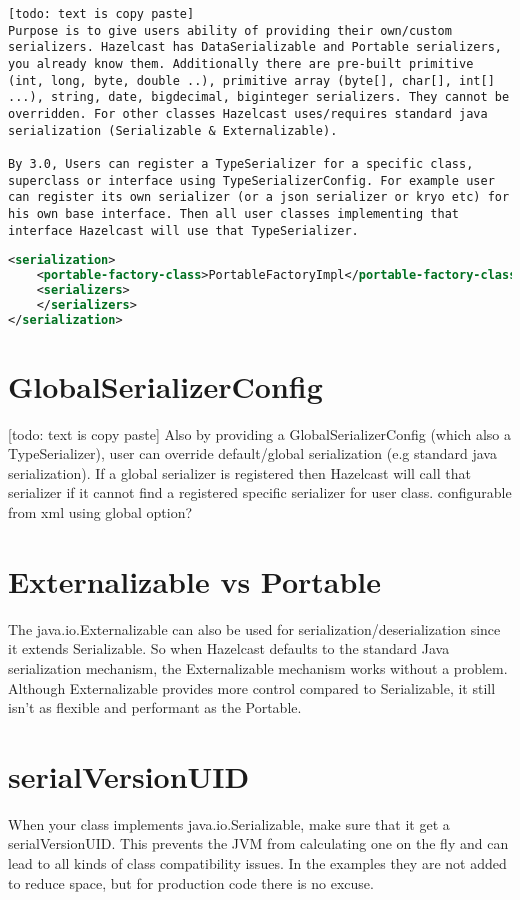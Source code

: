\begin{lstlisting}
[todo: text is copy paste]
Purpose is to give users ability of providing their own/custom serializers. Hazelcast has DataSerializable and Portable serializers, you already know them. Additionally there are pre-built primitive (int, long, byte, double ..), primitive array (byte[], char[], int[] ...), string, date, bigdecimal, biginteger serializers. They cannot be overridden. For other classes Hazelcast uses/requires standard java serialization (Serializable & Externalizable). 

By 3.0, Users can register a TypeSerializer for a specific class, superclass or interface using TypeSerializerConfig. For example user can register its own serializer (or a json serializer or kryo etc) for his own base interface. Then all user classes implementing that interface Hazelcast will use that TypeSerializer.
\end{lstlisting}

\begin{lstlisting}[language=xml]
<serialization>
    <portable-factory-class>PortableFactoryImpl</portable-factory-class>
    <serializers>
    </serializers>
</serialization>
\end{lstlisting}

\section{GlobalSerializerConfig}
[todo: text is copy paste]
Also by providing a GlobalSerializerConfig (which also a TypeSerializer), user can override default/global serialization (e.g standard java serialization). If a global serializer is registered then Hazelcast will call that serializer if it cannot find a registered specific serializer for user class. configurable from xml using global option?

\section{Externalizable vs Portable}
The java.io.Externalizable can also be used for serialization/deserialization since it extends Serializable. So when Hazelcast defaults to the standard Java serialization mechanism, the Externalizable mechanism works without a problem. Although Externalizable provides more control compared to Serializable, it still isn't as flexible and performant as the Portable.

\section{serialVersionUID} 
When your class implements java.io.Serializable, make sure that it get a serialVersionUID. This prevents the JVM from calculating one on the fly and can lead to all kinds of class compatibility issues. In the examples they are not added to reduce space, but for production code there is no excuse.

